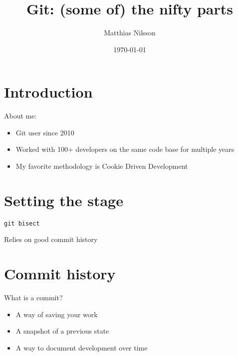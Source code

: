\documentclass[11pt,xetex]{beamer}
\title{Git: (some of) the nifty parts}
\date{\today}
\author{Matthias Nilsson}
\begin{document}
\maketitle

\section*{Introduction}

\begin{frame}{}
  \Large
  About me:

  \normalsize
  \begin{itemize}
    \item Git user since 2010
    \item Worked with 100+ developers on the same code base for multiple years
    \item My favorite methodology is Cookie Driven Development
  \end{itemize}
\end{frame}

\section*{Setting the stage}

\begin{frame}[fragile]{}
  \begin{center}
    \Huge \texttt{git bisect}
  \end{center}
\end{frame}

\begin{frame}{}
  \begin{center}
    \LARGE Relies on good commit history
  \end{center}
\end{frame}

\section*{Commit history}

\begin{frame}{}
  \begin{center}
    \Huge What is a commit?
  \end{center}
  \pause

  \large
  \begin{itemize}
    \item A way of saving your work
    \pause
    \item A snapshot of a previous state
    \pause
    \item A way to document development over time
  \end{itemize}
\end{frame}
\end{document}
